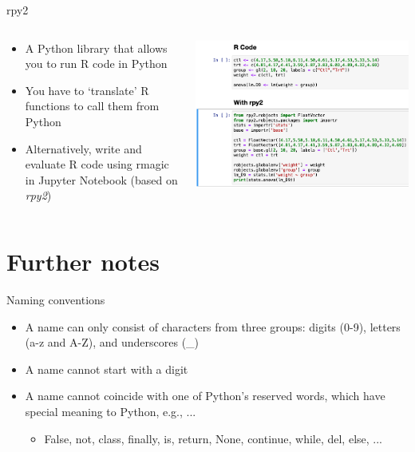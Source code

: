 \documentclass[10pt, aspectratio=169]{beamer}
\newcommand{\gemph}[1]{\textcolor{mzesgold}{#1}}
\begin{document}
{	\begin{frame}{rpy2}
  \begin{columns}
\begin{column}{0.5\textwidth}
    \begin{itemize}
        \item A Python library that allows you to run R code in Python
        \item You have to ‘translate’ R functions to call them from Python
        \item Alternatively, write and evaluate R code using \gemph{rmagic} in Jupyter Notebook (based on \textit{rpy2})
    \end{itemize}
\end{column}
\begin{column}{0.5\textwidth}  %
    \begin{center}
      \includegraphics[scale=.28]{Day 1/Slides/LaTeX files/rpy2.png} 
     \end{center}
\end{column}
\end{columns}
  \end{frame}

\section{Further notes}
\begin{frame}{Naming conventions}
    \begin{itemize}
        \item A name can only consist of characters from three groups: digits (0-9), letters (a-z and A-Z), and underscores (\_)
        \item A name cannot start with a digit
        \item A name cannot coincide with one of Python’s reserved words, which have special meaning to Python, e.g., ...
        \begin{itemize}
            \item False, not, class, finally, is, return, None, continue, while, del, else, ...
        \end{itemize}
    \end{itemize}
\end{frame}

}
\end{document}
